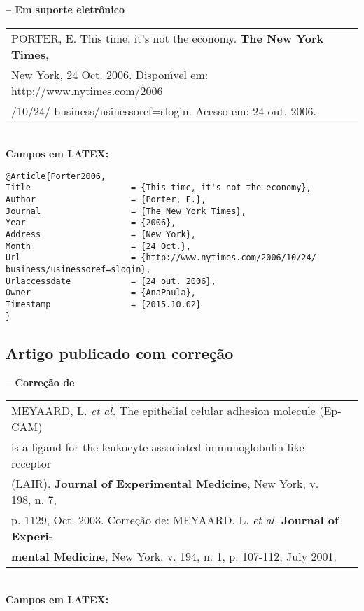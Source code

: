 \textbf{-- Em suporte eletr\^onico} \\

\begin{tabular}{|l|c|} \hline
	PORTER, E. This time, it's not the economy. \textbf{The New York Times}, \\New 
	York, 24 Oct. 2006. Dispon\'{\i}vel em: http://www.nytimes.com/2006\\/10/24/
	business/usinessoref=slogin. Acesso em: 24 out. 2006. \\\hline
\end{tabular} \\

\textbf{Campos em LATEX:} 

\begin{verbatim}
@Article{Porter2006,
Title                    = {This time, it's not the economy},
Author                   = {Porter, E.},
Journal                  = {The New York Times},
Year                     = {2006},
Address                  = {New York},
Month                    = {24 Oct.},
Url                      = {http://www.nytimes.com/2006/10/24/
business/usinessoref=slogin},
Urlaccessdate            = {24 out. 2006},
Owner                    = {AnaPaula},
Timestamp                = {2015.10.02}
}
\end{verbatim}

\subsection{Artigo publicado com corre\c{c}\~ao}

\textbf{-- Corre\c{c}\~ao de} \\

\begin{tabular}{|l|c|} \hline
	MEYAARD, L. \textit{et al.} The epithelial celular adhesion molecule (Ep-CAM)\\
	is a ligand for the leukocyte-associated immunoglobulin-like receptor
	\\(LAIR). \textbf{Journal of Experimental Medicine}, New York, v. 198, n. 7,\\ 
	p.	1129, Oct. 2003. Corre\c{c}\~ao de: MEYAARD, L. \textit{et al.} \textbf{Journal of Experi-}\\ \textbf{mental Medicine}, New York, v. 194, n. 1, p. 107-112, July 2001.\\\hline
\end{tabular} \\

\textbf{Campos em LATEX:} 

